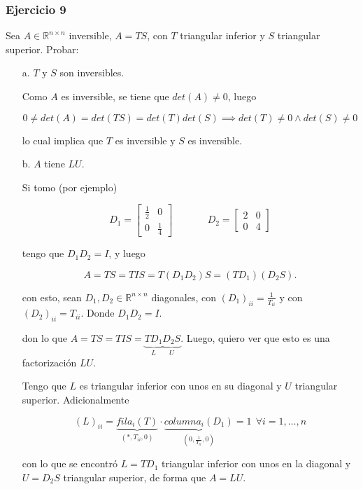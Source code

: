 \subsubsection{Ejercicio 9}\label{subsubsec:guia_2_ej_9}

Sea $A \in \mathbb{R}^{n \times n}$ inversible, $A = TS$, con $T$ triangular inferior y $S$ triangular superior. Probar:

\begin{itemize}
    \item[a.] $T$ y $S$ son inversibles.
    
    Como $A$ es inversible, se tiene que $det(A) \neq 0$, luego
    
    \[0 \neq det(A) = det(TS) = det(T)det(S) \implies det(T) \neq 0 \land det(S) \neq 0\]
    
    lo cual implica que $T$ es inversible y $S$ es inversible.
    
    \item[b.] $A$ tiene $LU$.
    
    Si tomo (por ejemplo)
    
    \[
    D_1 = 
    \begin{bmatrix}
        \frac{1}{2} & 0 \\
        0 & \frac{1}{4}
    \end{bmatrix}
    ~~~~~~~~~~~~~~~~
    D_2 = 
    \begin{bmatrix}
        2 & 0 \\
        0 & 4
    \end{bmatrix}
    \]
    
    tengo que $D_1 D_2 = I$, y luego
    
    \[A = TS = TIS = T(D_1 D_2)S = (TD_1)(D_2 S).\]
    
    con esto, sean $D_1 , D_2 \in \mathbb{R}^{n \times n}$ diagonales, con ${(D_1)}_{ii} =  \frac{1}{T_{ii}}$ y con ${(D_2)}_{ii} = T_{ii}$. Donde $D_1 D_2 = I$.
    
    don lo que $A = TS = TIS = \underbrace{TD_1}_{L}\underbrace{D_2 S}_{U}$. Luego, quiero ver que esto es una factorización $LU$.
    
    Tengo que $L$ es triangular inferior con unos en su diagonal y $U$ triangular superior. Adicionalmente
    
    \[(L)_{ii} = \underbrace{fila_i(T)}_{(*,T_{ii},0)}\cdot \underbrace{columna_i(D_1)}_{(0,\frac{1}{T_{ii}},0)} = 1 ~~\forall i = 1,\ldots,n\]
    
    con lo que se encontró $L = TD_1$ triangular inferior con unos en la diagonal y $U = D_2 S$ triangular superior, de forma que $A = LU$.
    

\end{itemize}
